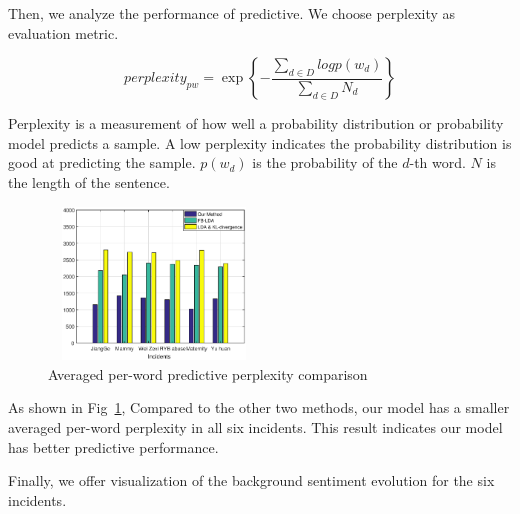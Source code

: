 \documentclass[runningheads]{llncs}
\begin{document}
Then, we analyze the performance of predictive. We choose perplexity as evaluation metric. 

\begin{equation}
    perplexity_{pw} = \exp\left\{-\frac{\sum_{d \in D}logp(w_d)}{\sum_{d \in D}N_d} \right\}
\end{equation}

Perplexity is a measurement of how well a probability distribution or probability model predicts a sample. A low perplexity indicates the probability distribution is good at predicting the sample. $p(w_d)$ is the probability of the $d$-th word. $N$ is the length of the sentence.

\vspace{-0.6cm}
\begin{figure}
    \centering
    \includegraphics[width=0.5\textwidth,height=1.6in]{perplexity.eps}
    \setlength{\abovecaptionskip}{-0.1cm}
    \caption{Averaged per-word predictive perplexity comparison}\label{fig:perplexity}
\end{figure}

As shown in Fig~\ref{fig:perplexity},  Compared to the other two methods, our model has a smaller averaged per-word perplexity in all six incidents. This result indicates our model has better predictive performance.

Finally, we offer visualization of the background sentiment evolution for the six incidents. 
\end{document}
